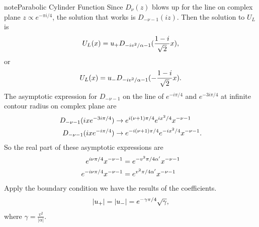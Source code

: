 \documentclass[letterpaper,12pt,english]{sphinxmanual}
\begin{document}
\begin{notice}{note}{Parabolic Cylinder Function}
Since \(D_{\nu}(z)\) blows up for the line on complex plane \(z\propto e^{-\pi i/4}\), the solution that works is \(D_{-\nu-1}(iz)\). Then the solution to \(U_L\) is
\begin{gather}
\begin{split}U_L(x) = u_{+} D_{-iv^2/\alpha -1} (\frac{1-i}{\sqrt{2}} x) ,\end{split}\notag
\end{gather}
or
\begin{gather}
\begin{split}U_L(x) = u_- D_{-iv^2/\alpha -1} ( - \frac{1-i}{\sqrt{2}} x) .\end{split}\notag
\end{gather}
The asymptotic expression for \(D_{-\nu-1}\) on the line of \(e^{-i\pi/4}\) and \(e^{-3i\pi/4}\) at infinite contour radius on complex plane are
\begin{gather}
\begin{split}D_{-\nu-1}(i x e^{-3i\pi/4}) &\to e^{i(\nu+1)\pi/4} e^{i x^2/4} x^{-\nu-1} \\
D_{-\nu-1}(i x e^{-i\pi/4}) &\to e^{-i(\nu+1)\pi/4} e^{-i x^2/4} x^{-\nu-1}.\end{split}\notag
\end{gather}
So the real part of these asymptotic expressions are
\begin{gather}
\begin{split}e^{i\nu\pi/4} x^{-\nu-1} &= e^{-v^2\pi/4\alpha'} x^{-\nu-1} \\
e^{-i\nu\pi/4} x^{-\nu-1} &=e^{v^2\pi/4\alpha'} x^{-\nu-1}\end{split}\notag
\end{gather}
Apply the boundary condition we have the results of the coefficients.
\begin{gather}
\begin{split}\lvert u_+ \rvert = \lvert u_- \rvert = e^{-\gamma \pi/4}\sqrt{\gamma} ,\end{split}\notag
\end{gather}
where \(\gamma = \frac{v^2}{\lvert \alpha \rvert}\).


\end{notice}
\end{document}
